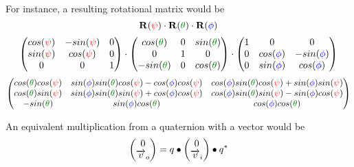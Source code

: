 For instance, a resulting rotational matrix would be 
\begin{equation}
\mat R(\Yaw) \multiplication \mat R(\Pitch) \multiplication \mat R(\Roll)
\end{equation}
\begin{equation}
\begin{pmatrix}
cos(\Yaw) & -sin(\Yaw) & 0 \\
sin(\Yaw) &  cos(\Yaw) & 0 \\
0         &      0     & 1
\end{pmatrix} \multiplication \begin{pmatrix}
 cos(\Pitch) & 0 & sin(\Pitch) \\
 0         & 1 &     0     \\
-sin(\Pitch) & 0 & cos(\Pitch) 
\end{pmatrix} \multiplication \begin{pmatrix}
1 & 0         &     0      \\
0 & cos(\Roll) & -sin(\Roll) \\
0 & sin(\Roll) &  cos(\Roll) 
\end{pmatrix}
\end{equation}
\begin{equation}
\begin{pmatrix}
cos(\Pitch)cos(\Yaw)	& sin(\Roll)sin(\Pitch)cos(\Yaw) - cos(\Roll)cos(\Yaw)	& cos(\Roll)sin(\Pitch)cos(\Yaw) + sin(\Roll)sin(\Yaw)\\
cos(\Pitch)sin(\Yaw)	& sin(\Roll)sin(\Pitch)sin(\Yaw) + cos(\Roll)cos(\Yaw)	& cos(\Roll)sin(\Pitch)sin(\Yaw) - sin(\Roll)cos(\Yaw) \\
-sin(\Pitch)			& sin(\Roll)cos(\Pitch)									& cos(\Roll)cos(\Pitch)
\end{pmatrix}
\end{equation}

An equivalent multiplication from a quaternion with a vector would be
\begin{equation}
\begin{pmatrix}0\\\overrightarrow{v}_o\end{pmatrix} = q_{} \bullet \begin{pmatrix}0\\\overrightarrow{v}_i\end{pmatrix} \bullet q_{}^*
\end{equation}


